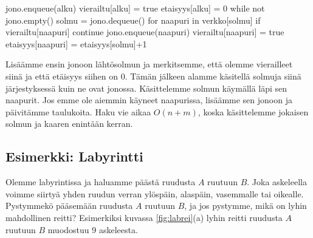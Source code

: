 \begin{code}
jono.enqueue(alku)
vierailtu[alku] = true
etaisyys[alku] = 0
while not jono.empty()
    solmu = jono.dequeue()
    for naapuri in verkko[solmu]
        if vierailtu[naapuri]
            continue
        jono.enqueue(naapuri)
        vierailtu[naapuri] = true
        etaisyys[naapuri] = etaisyys[solmu]+1
\end{code}

Lisäämme ensin jonoon lähtösolmun ja merkitsemme,
että olemme vierailleet siinä ja että etäisyys siihen on $0$.
Tämän jälkeen alamme käsitellä solmuja siinä järjestyksessä kuin ne ovat jonossa.
Käsittelemme solmun käymällä läpi sen naapurit.
Jos emme ole aiemmin käyneet naapurissa, lisäämme sen jonoon
ja päivitämme taulukoita.
Haku vie aikaa $O(n+m)$, koska käsittelemme jokaisen
solmun ja kaaren enintään kerran.

\subsection{Esimerkki: Labyrintti}

Olemme labyrintissa ja haluamme päästä ruudusta $A$ ruutuun $B$.
Joka askeleella voimme siirtyä yhden ruudun verran ylöspäin, alaspäin,
vasemmalle tai oikealle.
Pystymmekö pääsemään ruudusta $A$ ruutuun $B$, ja jos pystymme,
mikä on lyhin mahdollinen reitti?
Esimerkiksi kuvassa \ref{fig:labrei}(a) lyhin reitti
ruudusta $A$ ruutuun $B$ muodostuu 9 askeleesta.

